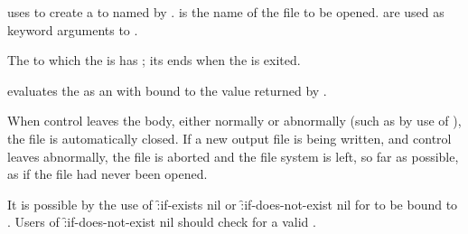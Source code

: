 uses  to create a 
to  named by . 
 is the name of the file to be opened.
 are used as keyword arguments to .

The   to which the   
is  has ;
its  ends when the  is exited.

 evaluates the  as an  
with  bound to 
the value returned by .

When control leaves the body, either normally or abnormally (such as by
use of ), the file is automatically closed.  If a new
output file is being written, and control leaves abnormally, the file is
aborted and the file system is left, so far as possible, as if the file
had never been opened.  

It is possible by the use of \f{:if-exists nil} 
or \f{:if-does-not-exist nil} for
 to be bound to \nil.
Users of \f{:if-does-not-exist nil} should check for a valid .


